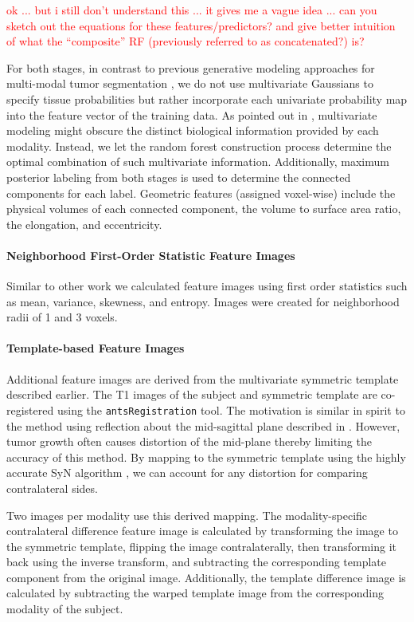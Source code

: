 \documentclass[final,5p,times,twocolumn]{elsarticle}
\begin{document}
\textcolor{red}{ok ... but i still don't understand this ... it gives
  me a vague idea ... can you sketch out the equations for these
  features/predictors? and give better intuition of what the
  ``composite'' RF (previously referred to as concatenated?) is?}

For both stages, in contrast to previous generative
modeling approaches for multi-modal tumor segmentation 
\citep[e.g.][]{prastawa2003}, we do not use multivariate 
Gaussians to specify tissue probabilities but rather incorporate each
univariate probability map into the feature vector of the training
data.  As pointed out in \cite{menze2010}, multivariate modeling
might obscure the distinct biological information provided by each 
modality.  Instead, we let the random forest construction 
process determine the optimal combination of such multivariate
information.  Additionally, maximum posterior labeling from both stages
is used to determine the connected components for each label.  
Geometric features (assigned voxel-wise) include the physical volumes 
of each connected component, the volume to surface area ratio, 
the elongation, and eccentricity. 

\paragraph{Neighborhood First-Order Statistic Feature Images}
Similar to other work \cite{bauer2012,zikic2012} we calculated
feature images using first order statistics such as mean, 
variance, skewness, and entropy.  Images were created for 
neighborhood radii of 1 and 3 voxels.

\paragraph{Template-based Feature Images}
Additional feature images are derived from the multivariate 
symmetric template described earlier. The T1 images of the 
subject and symmetric template are co-registered 
\citep{tustison2013a} using the {\tt antsRegistration} 
tool.  The motivation is similar in spirit to the method
using reflection about the mid-sagittal plane described in 
\cite{geremia2012}.  However, tumor growth often causes 
distortion of the mid-plane thereby limiting the accuracy of
this method.  By mapping to the symmetric template using the
highly accurate SyN algorithm \cite{avants2011a}, we can 
account for any distortion for comparing contralateral
sides.

Two images per modality use this derived mapping.  The modality-specific
contralateral difference feature image is calculated by transforming
the image to the symmetric template, flipping the image contralaterally,
then transforming it back using the inverse transform, and subtracting
the corresponding template component from the original image.  Additionally, 
the template difference image is calculated by subtracting the warped template 
image from the corresponding modality of the subject.
\end{document}
